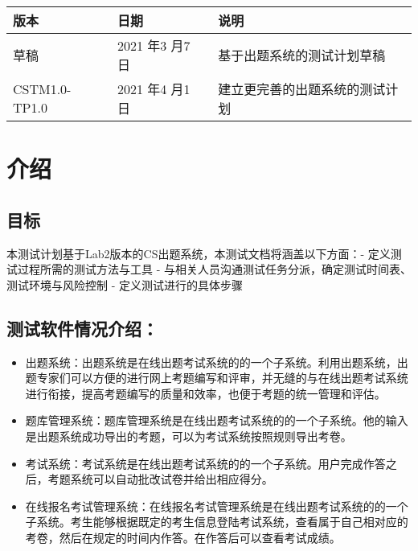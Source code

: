 \documentclass[hyperref, a4paper]{ctexart}
\providecommand{\tightlist}{%
  \setlength{\itemsep}{0pt}\setlength{\parskip}{0pt}}
\begin{document}
\begin{tabular}{|p{2cm}|p{3.3cm}|p{5cm}|}
\hline
版本 & 日期 & 说明\\
\hline
草稿 & 2021 年3 月7 日 & 基于出题系统的测试计划草稿\\
\hline
CSTM1.0-TP1.0 & 2021 年4 月1 日 & 建立更完善的出题系统的测试计划\\
\hline
\end{tabular}

\hypertarget{ux4ecbux7ecd}{%
\section{介绍}\label{ux4ecbux7ecd}}

\hypertarget{ux76eeux6807}{%
\subsection{目标}\label{ux76eeux6807}}

本测试计划基于Lab2版本的CS出题系统，本测试文档将涵盖以下方面：\newline -
定义测试过程所需的测试方法与工具 -
与相关人员沟通测试任务分派，确定测试时间表、测试环境与风险控制 -
定义测试进行的具体步骤

\hypertarget{ux6d4bux8bd5ux8f6fux4ef6ux60c5ux51b5ux4ecbux7ecd}{%
\subsection{测试软件情况介绍：}\label{ux6d4bux8bd5ux8f6fux4ef6ux60c5ux51b5ux4ecbux7ecd}}

\begin{itemize}
\tightlist
\item
  出题系统：出题系统是在线出题考试系统的的⼀个⼦系统。利⽤出题系统，出题专家们可以⽅便的进⾏⽹上考题编写和评审，并⽆缝的与在线出题考试系统进⾏衔接，提⾼考题编写的质量和效率，也便于考题的统⼀管理和评估。
\item
  题库管理系统：题库管理系统是在线出题考试系统的的⼀个⼦系统。他的输⼊是出题系统成功导出的考题，可以为考试系统按照规则导出考卷。
\item
  考试系统：考试系统是在线出题考试系统的的⼀个⼦系统。用户完成作答之后，考题系统可以自动批改试卷并给出相应得分。
\item
  在线报名考试管理系统：在线报名考试管理系统是在线出题考试系统的的⼀个⼦系统。考生能够根据既定的考生信息登陆考试系统，查看属于自己相对应的考卷，然后在规定的时间内作答。在作答后可以查看考试成绩。
\end{itemize}
\end{document}
